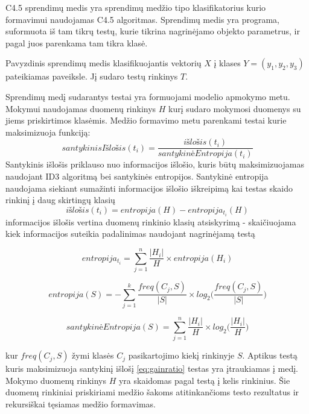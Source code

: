 C4.5 sprendimų medis yra sprendimų medžio tipo klasifikatorius kurio formavimui naudojamas C4.5 algoritmas.
Sprendimų medis yra programa, suformuota iš tam tikrų testų, kurie tikrina nagrinėjamo objekto parametrus,
ir pagal juos parenkama tam tikra klasė.


Pavyzdinis sprendimų medis klasifikuojantis vektorių $X$ į klases $Y = (y_1, y_2, y_3)$ pateikiamas
  paveiksle. Jį sudaro testų rinkinys $T$.

Sprendimų medį sudarantys testai yra formuojami modelio apmokymo metu. Mokymui naudojamas duomenų
rinkinys $H$ kurį sudaro mokymosi duomenys su jiems priskirtimos klasėmis. Medžio formavimo metu
parenkami testai kurie maksimizuoja funkciją:
\begin{equation} \label{eq:gainratio}
    santykinisIšlošis(t_i) = \frac{išlošis(t_i)}{santykinėEntropija(t_i)}
\end{equation}
Santykinis išlošis priklauso nuo informacijos išlošio, kuris būtų maksimizuojamas naudojant ID3
algoritmą bei santykinės entropijos. Santykinė entropija naudojama siekiant sumažinti informacijos
išlošio iškreipimą kai testas skaido rinkinį į daug skirtingų klasių \cite{c45}
\begin{equation}
    išlošis(t_i) = entropija(H) - entropija_{t_i}(H)
\end{equation}
informacijos išlošis vertina duomenų rinkinio klasių atsiskyrimą - skaičiuojama kiek informacijos
suteikia padalinimas naudojant nagrinėjamą testą

\begin{equation}
    entropija_{t_i} = \sum_{j=1}^{n} \frac{|H_i|}{H} \times entropija(H_i)
\end{equation}

\begin{equation}
    entropija(S) = - \sum_{j=1}^{k} \frac{freq(C_j, S)}{|S|} \times log_2 \big( \frac{freq(C_j, S)}{|S|} \big)
\end{equation}

\begin{equation}
    santykinėEntropija(S) =  \sum_{j=1}^{n} \frac{|H_i|}{H} \times log_2 \big( \frac{|H_i|}{H} \big)
\end{equation}

kur $freq(C_j, S)$ žymi klasės $C_j$ pasikartojimo kiekį rinkinyje $S$.
Aptikus testą kuris maksimizuoja santykinį išlošį \ref{eq:gainratio} testas yra įtraukiamas į medį.
Mokymo duomenų rinkinys $H$ yra skaidomas pagal testą į kelis rinkinius\cite{c45}. Šie duomenų
rinkiniai priskiriami medžio šakoms atitinkančioms testo rezultatus ir rekursiškai tęsiamas medžio formavimas.

